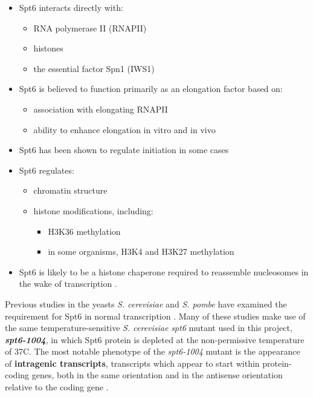 \documentclass[11pt, letterpaper]{article}
\begin{document}
\begin{itemize}[nosep, topsep=.5em]
\item Spt6 interacts directly with:
	\begin{itemize}[nosep]
	\item RNA polymerase II (RNAPII) \cite{close2011, diebold2011, liu2011, sdano2017, sun2010, yoh2007}
	\item histones \cite{bortvin1996, mccullough2015}
	\item the essential factor Spn1 (IWS1) \cite{diebold2010b, li2018, mcdonald2010}
	\end{itemize}
\item Spt6 is believed to function primarily as an elongation factor based on:
	\begin{itemize}[nosep]
	\item association with elongating RNAPII \cite{andrulis2000, ivanovska2011, kaplan2000, mayer2010}
	\item ability to enhance elongation in vitro \cite{endoh2004} and in vivo \cite{ardehali2009}
	\end{itemize}
\item Spt6 has been shown to regulate initiation in some cases \cite{adkins2006, ivanovska2011}
\item Spt6 regulates:
	\begin{itemize}[nosep]
	\item chromatin structure \cite{bortvin1996, degennaro2013, ivanovska2011, jeronimo2015, kaplan2003, perales2013, vanbakel2013}
	\item histone modifications, including:
		\begin{itemize}[nosep]
		\item H3K36 methylation \cite{carrozza2005, chu2006, yoh2008, youdell2008}
		\item in some organisms, H3K4 and H3K27 methylation \cite{begum2012, chen2012, degennaro2013, wang2017, wang2013}
		\end{itemize}
	\end{itemize}
\item Spt6 is likely to be a histone chaperone required to reassemble nucleosomes in the wake of transcription \cite{duina2011}.
\end{itemize}

Previous studies in the yeasts \textit{S. cerevisiae} and \textit{S. pombe} have examined the requirement for Spt6 in normal transcription \cite{cheung2008, degennaro2013, kaplan2003, pathak2018, uwimana2017, vanbakel2013}. Many of these studies make use of the same temperature-sensitive \textit{S. cerevisiae} \textit{spt6} mutant used in this project, \textbf{\textit{spt6-1004}}, in which Spt6 protein is depleted at the non-permissive temperature of 37\textdegree C. The most notable phenotype of the \textit{spt6-1004} mutant is the appearance of \textbf{intragenic transcripts}, transcripts which appear to start within protein-coding genes, both in the same orientation and in the antisense orientation relative to the coding gene \cite{cheung2008, degennaro2013, kaplan2003, uwimana2017}.
\end{document}
